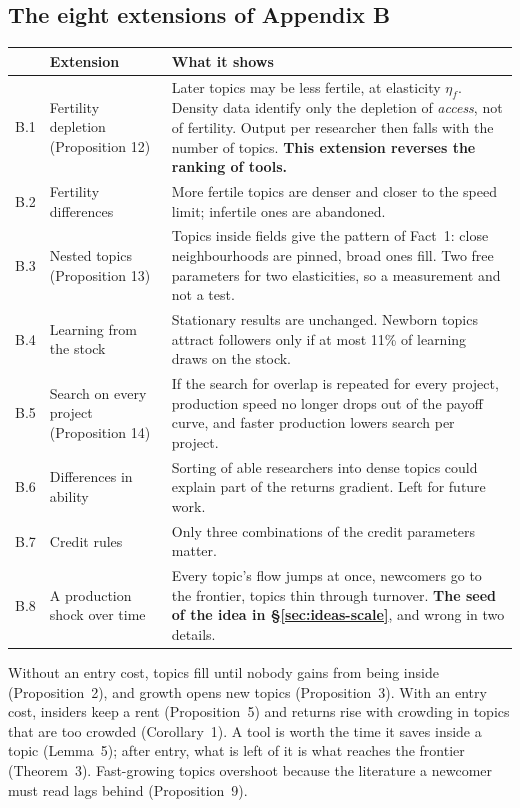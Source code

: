 \subsection{The eight extensions of Appendix B}

{\small
\begin{longtable}{@{}P{0.35in}P{1.6in}P{3.75in}@{}}
\toprule
 & Extension & What it shows \\
\midrule
\endhead
\bottomrule
\endfoot
B.1 & Fertility depletion (Proposition 12) & Later topics may be less fertile, at elasticity $\eta_f$. Density data identify only the depletion of \emph{access}, not of fertility. Output per researcher then falls with the number of topics. \textbf{This extension reverses the ranking of tools.} \\
B.2 & Fertility differences & More fertile topics are denser and closer to the speed limit; infertile ones are abandoned. \\
B.3 & Nested topics (Proposition 13) & Topics inside fields give the pattern of Fact~1: close neighbourhoods are pinned, broad ones fill. Two free parameters for two elasticities, so a measurement and not a test. \\
B.4 & Learning from the stock & Stationary results are unchanged. Newborn topics attract followers only if at most 11\% of learning draws on the stock. \\
B.5 & Search on every project (Proposition 14) & If the search for overlap is repeated for every project, production speed no longer drops out of the payoff curve, and faster production lowers search per project. \\
B.6 & Differences in ability & Sorting of able researchers into dense topics could explain part of the returns gradient. Left for future work. \\
B.7 & Credit rules & Only three combinations of the credit parameters matter. \\
B.8 & A production shock over time & Every topic's flow jumps at once, newcomers go to the frontier, topics thin through turnover. \textbf{The seed of the idea in \S\ref{sec:ideas-scale}}, and wrong in two details. \\
\end{longtable}
}

\begin{keybox}
Without an entry cost, topics fill until nobody gains from being inside (Proposition~2), and growth opens new topics (Proposition~3).
With an entry cost, insiders keep a rent (Proposition~5) and returns rise with crowding in topics that are too crowded (Corollary~1).
A tool is worth the time it saves inside a topic (Lemma~5); after entry, what is left of it is what reaches the frontier (Theorem~3).
Fast-growing topics overshoot because the literature a newcomer must read lags behind (Proposition~9).
\end{keybox}
